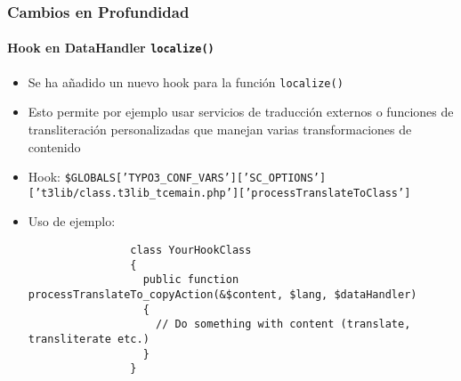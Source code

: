 \begin{frame}[fragile]
	\frametitle{Cambios en Profundidad}
	\framesubtitle{Hook en DataHandler \texttt{localize()}}

	\lstset{basicstyle=\tiny\ttfamily}

	\begin{itemize}
		\item Se ha añadido un nuevo hook para la función \texttt{localize()}
		\item Esto permite por ejemplo usar servicios de traducción externos o funciones de transliteración
			personalizadas que manejan varias transformaciones de contenido
	\end{itemize}

	\begin{itemize}
		\item Hook:\newline
			\smaller
				\texttt{\$GLOBALS['TYPO3\_CONF\_VARS']['SC\_OPTIONS']\newline
				\tabto{0.4cm}['t3lib/class.t3lib\_tcemain.php']['processTranslateToClass']}
			\normalsize

		\item Uso de ejemplo:

			\begin{lstlisting}
				class YourHookClass
				{
				  public function processTranslateTo_copyAction(&$content, $lang, $dataHandler)
				  {
				    // Do something with content (translate, transliterate etc.)
				  }
				}
			\end{lstlisting}
	\end{itemize}

\end{frame}









